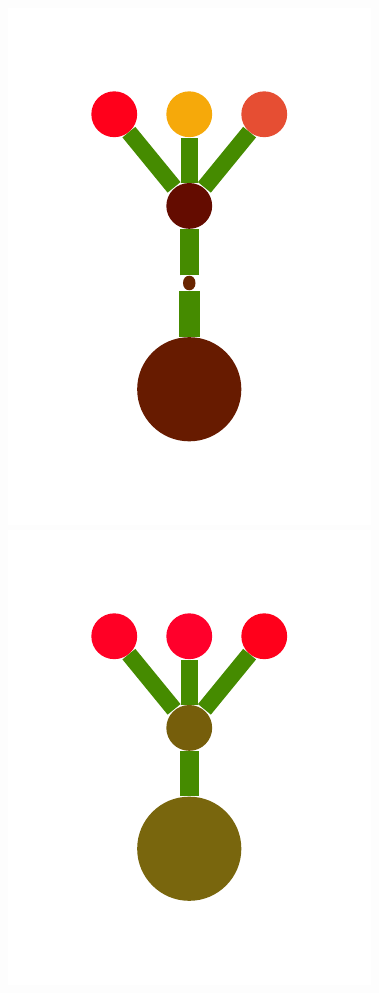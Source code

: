 \documentclass[a4paper,10pt]{article}
\begin{document}
\begin{figure}[t]
  \includegraphics[scale=.26]{../figures/vector/2-2-initProgram-6.pdf}
  \includegraphics[scale=.26]{../figures/vector/2-2-initProgram-8.pdf}

\end{figure}
\end{document}
